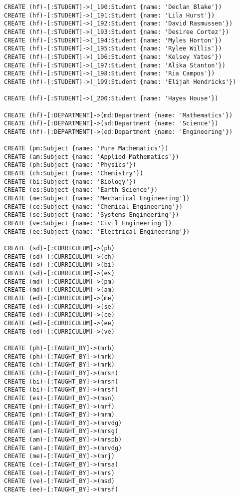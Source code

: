 \begin{lstlisting}
CREATE (hf)-[:STUDENT]->(_190:Student {name: 'Declan Blake'})
CREATE (hf)-[:STUDENT]->(_191:Student {name: 'Lila Hurst'})
CREATE (hf)-[:STUDENT]->(_192:Student {name: 'David Rasmussen'})
CREATE (hf)-[:STUDENT]->(_193:Student {name: 'Desiree Cortez'})
CREATE (hf)-[:STUDENT]->(_194:Student {name: 'Myles Horton'})
CREATE (hf)-[:STUDENT]->(_195:Student {name: 'Rylee Willis'})
CREATE (hf)-[:STUDENT]->(_196:Student {name: 'Kelsey Yates'})
CREATE (hf)-[:STUDENT]->(_197:Student {name: 'Alika Stanton'})
CREATE (hf)-[:STUDENT]->(_198:Student {name: 'Ria Campos'})
CREATE (hf)-[:STUDENT]->(_199:Student {name: 'Elijah Hendricks'})

CREATE (hf)-[:STUDENT]->(_200:Student {name: 'Hayes House'})

CREATE (hf)-[:DEPARTMENT]->(md:Department {name: 'Mathematics'})
CREATE (hf)-[:DEPARTMENT]->(sd:Department {name: 'Science'})
CREATE (hf)-[:DEPARTMENT]->(ed:Department {name: 'Engineering'})

CREATE (pm:Subject {name: 'Pure Mathematics'})
CREATE (am:Subject {name: 'Applied Mathematics'})
CREATE (ph:Subject {name: 'Physics'})
CREATE (ch:Subject {name: 'Chemistry'})
CREATE (bi:Subject {name: 'Biology'})
CREATE (es:Subject {name: 'Earth Science'})
CREATE (me:Subject {name: 'Mechanical Engineering'})
CREATE (ce:Subject {name: 'Chemical Engineering'})
CREATE (se:Subject {name: 'Systems Engineering'})
CREATE (ve:Subject {name: 'Civil Engineering'})
CREATE (ee:Subject {name: 'Electrical Engineering'})

CREATE (sd)-[:CURRICULUM]->(ph)
CREATE (sd)-[:CURRICULUM]->(ch)
CREATE (sd)-[:CURRICULUM]->(bi)
CREATE (sd)-[:CURRICULUM]->(es)
CREATE (md)-[:CURRICULUM]->(pm)
CREATE (md)-[:CURRICULUM]->(am)
CREATE (ed)-[:CURRICULUM]->(me)
CREATE (ed)-[:CURRICULUM]->(se)
CREATE (ed)-[:CURRICULUM]->(ce)
CREATE (ed)-[:CURRICULUM]->(ee)
CREATE (ed)-[:CURRICULUM]->(ve)

CREATE (ph)-[:TAUGHT_BY]->(mrb)
CREATE (ph)-[:TAUGHT_BY]->(mrk)
CREATE (ch)-[:TAUGHT_BY]->(mrk)
CREATE (ch)-[:TAUGHT_BY]->(mrsn)
CREATE (bi)-[:TAUGHT_BY]->(mrsn)
CREATE (bi)-[:TAUGHT_BY]->(mrsf)
CREATE (es)-[:TAUGHT_BY]->(msn)
CREATE (pm)-[:TAUGHT_BY]->(mrf)
CREATE (pm)-[:TAUGHT_BY]->(mrm)
CREATE (pm)-[:TAUGHT_BY]->(mrvdg)
CREATE (am)-[:TAUGHT_BY]->(mrsg)
CREATE (am)-[:TAUGHT_BY]->(mrspb)
CREATE (am)-[:TAUGHT_BY]->(mrvdg)
CREATE (me)-[:TAUGHT_BY]->(mrj)
CREATE (ce)-[:TAUGHT_BY]->(mrsa)
CREATE (se)-[:TAUGHT_BY]->(mrs)
CREATE (ve)-[:TAUGHT_BY]->(msd)
CREATE (ee)-[:TAUGHT_BY]->(mrsf)


\end{lstlisting}
